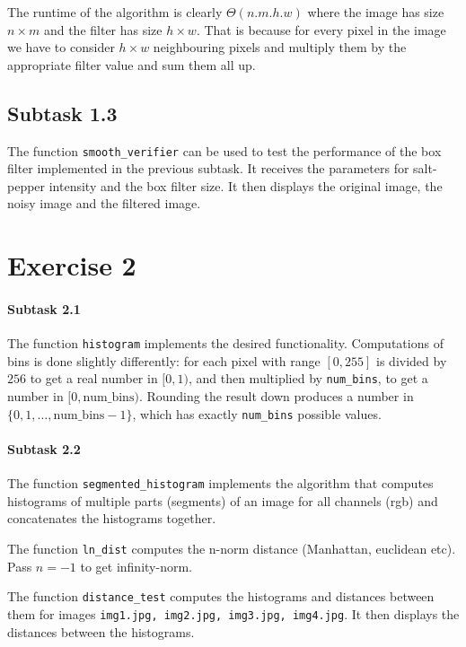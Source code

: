 \documentclass[a4paper]{article}
\begin{document}
The runtime of the algorithm is clearly $ \Theta(n.m.h.w) $ where the image has
size $ n \times m $ and the filter has size $ h \times w $. That is because for
every pixel in the image we have to consider $ h \times w $ neighbouring pixels
and multiply them by the appropriate filter value and sum them all up.

\subsection*{Subtask 1.3}

The function \texttt{smooth\_verifier} can be used to test the performance of
the box filter implemented in the previous subtask. It receives the parameters
for salt-pepper intensity and the box filter size. It then displays the
original image, the noisy image and the filtered image.

\section*{Exercise 2}

\paragraph*{Subtask 2.1}

The function \texttt{histogram} implements the desired functionality.
Computations of bins is done slightly differently: for each pixel with range
$ [0, 255] $ is divided by $ 256 $ to get a real number in $ [0, 1) $, and then
multiplied by \texttt{num\_bins}, to get a number in $ [0, \mathrm{num\_bins}) $.
Rounding the result down produces a number in $ \{ 0, 1, \dots,
\mathrm{num\_bins}-1 \} $, which has exactly \texttt{num\_bins} possible values.

\paragraph*{Subtask 2.2}

The function \texttt{segmented\_histogram} implements the algorithm that
computes histograms of multiple parts (segments) of an image for all channels
(rgb) and concatenates the histograms together.

The function \texttt{ln\_dist} computes the n-norm distance (Manhattan,
euclidean etc). Pass $ n = -1 $ to get infinity-norm.

The function \texttt{distance\_test} computes the histograms and distances
between them for images \texttt{img1.jpg, img2.jpg, img3.jpg, img4.jpg}. It
then displays the distances between the histograms.
\end{document}
